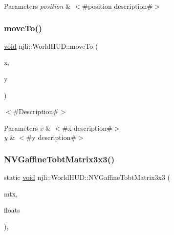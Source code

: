 \begin{DoxyParams}{Parameters}
{\em position} & $<$\#position description\#$>$ \\
\hline
\end{DoxyParams}
\mbox{\label{classnjli_1_1_world_h_u_d_ae6e492a62f645f4cf375849b97a0c4b8}} 
\subsubsection{\texorpdfstring{move\+To()}{moveTo()}\hspace{0.1cm}{\footnotesize\ttfamily [2/2]}}
{\footnotesize\ttfamily \mbox{\hyperlink{_thread_8h_af1e856da2e658414cb2456cb6f7ebc66}{void}} njli\+::\+World\+H\+U\+D\+::move\+To (\begin{DoxyParamCaption}\item[{\mbox{\hyperlink{_util_8h_a5f6906312a689f27d70e9d086649d3fd}{f32}}}]{x,  }\item[{\mbox{\hyperlink{_util_8h_a5f6906312a689f27d70e9d086649d3fd}{f32}}}]{y }\end{DoxyParamCaption})}

$<$\#\+Description\#$>$


\begin{DoxyParams}{Parameters}
{\em x} & $<$\#x description\#$>$ \\
\hline
{\em y} & $<$\#y description\#$>$ \\
\hline
\end{DoxyParams}
\mbox{\label{classnjli_1_1_world_h_u_d_a8a6886fa7797f7da9a84e61ec538a86d}} 
\subsubsection{\texorpdfstring{N\+V\+Gaffine\+Tobt\+Matrix3x3()}{NVGaffineTobtMatrix3x3()}}
{\footnotesize\ttfamily static \mbox{\hyperlink{_thread_8h_af1e856da2e658414cb2456cb6f7ebc66}{void}} njli\+::\+World\+H\+U\+D\+::\+N\+V\+Gaffine\+Tobt\+Matrix3x3 (\begin{DoxyParamCaption}\item[{bt\+Matrix3x3 \&}]{mtx,  }\item[{\mbox{\hyperlink{_util_8h_a5f6906312a689f27d70e9d086649d3fd}{f32}} $\ast$}]{floats }\end{DoxyParamCaption})\hspace{0.3cm}{\ttfamily [static]}, {\ttfamily [protected]}}

